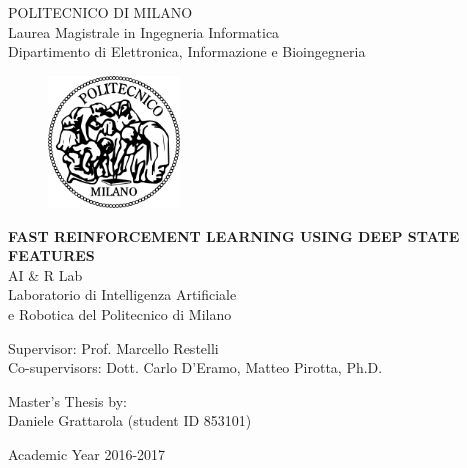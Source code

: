 \thispagestyle{empty}
\vspace*{-1.5cm} \bfseries{
\begin{center}
  \large
  POLITECNICO DI MILANO\\
  \normalsize
  Laurea Magistrale in Ingegneria Informatica\\
  Dipartimento di Elettronica, Informazione e Bioingegneria\\
  
  \vspace{0.6cm}
  \begin{figure}[htbp]
    \begin{center}
      \includegraphics[width=3.5cm]{./pictures/logopm.png}
    \end{center}
  \end{figure}
  \vspace*{0.3cm} \LARGE



  \textbf{FAST REINFORCEMENT LEARNING USING DEEP STATE FEATURES}\\



  \vspace*{.75truecm} \large
  AI \& R Lab \\
  Laboratorio di Intelligenza Artificiale \\
  e Robotica del Politecnico di Milano
\end{center}
\vspace*{3.0cm} \large
\begin{flushleft}


  Supervisor: Prof. Marcello Restelli \\
  Co-supervisors: Dott. Carlo D'Eramo, Matteo Pirotta, Ph.D.

\end{flushleft}
\vspace*{1.0cm}
\begin{flushright}


  Master's Thesis by:\\ Daniele Grattarola (student ID 853101)


\end{flushright}
\vspace*{0.5cm}
\begin{center}



  Academic Year 2016-2017
\end{center} \clearpage
}
